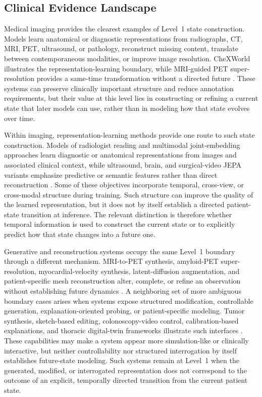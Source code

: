 \subsection{Clinical Evidence Landscape}

Medical imaging provides the clearest examples of Level~1 state construction. Models learn anatomical or diagnostic representations from radiographs, CT, MRI, PET, ultrasound, or pathology, reconstruct missing content, translate between contemporaneous modalities, or improve image resolution. CheXWorld illustrates the representation-learning boundary, while MRI-guided PET super-resolution provides a same-time transformation without a directed future \citep{yue2025chexworld,assran2023self}. These systems can preserve clinically important structure and reduce annotation requirements, but their value at this level lies in constructing or refining a current state that later models can use, rather than in modeling how that state evolves over time.

Within imaging, representation-learning methods provide one route to such state construction. Models of radiologist reading and multimodal joint-embedding approaches learn diagnostic or anatomical representations from images and associated clinical context, while ultrasound, brain, and surgical-video JEPA variants emphasize predictive or semantic features rather than direct reconstruction \citep{li2026world,li2025self,radhachandran2026us,shah2025vision,dong2024brain,ouyang2022self}. Some of these objectives incorporate temporal, cross-view, or cross-modal structure during training. Such structure can improve the quality of the learned representation, but it does not by itself establish a directed patient-state transition at inference. The relevant distinction is therefore whether temporal information is used to construct the current state or to explicitly predict how that state changes into a future one.

Generative and reconstruction systems occupy the same Level~1 boundary through a different mechanism. MRI-to-PET synthesis, amyloid-PET super-resolution, myocardial-velocity synthesis, latent-diffusion augmentation, and patient-specific mesh reconstruction alter, complete, or refine an observation without establishing future dynamics \citep{xing2022hdl,dhinagar2024generative,shah2024enhancing,wei2020predicting,liu2026personalized}. A neighboring set of more ambiguous boundary cases arises when systems expose structured modification, controllable generation, explanation-oriented probing, or patient-specific modeling. Tumor synthesis, sketch-based editing, colonoscopy-video control, calibration-based explanations, and thoracic digital-twin frameworks illustrate such interfaces \citep{thiagarajan2022training,biller2025biophysically,kim2025tumor,huang2025interactive,fu2026depthpilot,avanzato2024lung}. These capabilities may make a system appear more simulation-like or clinically interactive, but neither controllability nor structured interrogation by itself establishes future-state modeling. Such systems remain at Level~1 when the generated, modified, or interrogated representation does not correspond to the outcome of an explicit, temporally directed transition from the current patient state.

